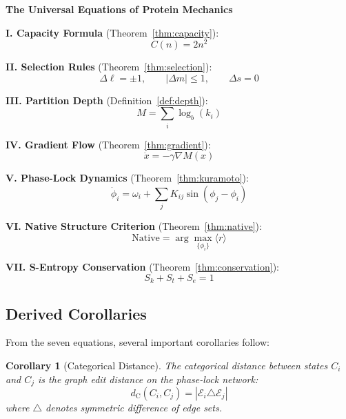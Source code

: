 \documentclass[aps,prx,superscriptaddress,twocolumn,10pt,a4paper,longbibliography,preprint]{revtex4-2}
\newcommand{\dC}{d_{\mathrm{C}}}
\newcommand{\calE}{\mathcal{E}}
\newcommand{\orderp}{\langle r \rangle}
\newtheorem{corollary}[theorem]{Corollary}
\theoremstyle{definition}
\theoremstyle{remark}
\begin{document}
\begin{mdframed}[linewidth=1.5pt, linecolor=black, backgroundcolor=gray!3]
\textbf{The Universal Equations of Protein Mechanics}

\medskip

\textbf{I. Capacity Formula} (Theorem~\ref{thm:capacity}):
\begin{equation}
C(n) = 2n^2
\tag{I}
\end{equation}

\textbf{II. Selection Rules} (Theorem~\ref{thm:selection}):
\begin{equation}
\Delta\ell = \pm 1, \qquad |\Delta m| \leq 1, \qquad \Delta s = 0
\tag{II}
\end{equation}

\textbf{III. Partition Depth} (Definition~\ref{def:depth}):
\begin{equation}
M = \sum_i \log_b(k_i)
\tag{III}
\end{equation}

\textbf{IV. Gradient Flow} (Theorem~\ref{thm:gradient}):
\begin{equation}
\dot{x} = -\gamma \nabla M(x)
\tag{IV}
\end{equation}

\textbf{V. Phase-Lock Dynamics} (Theorem~\ref{thm:kuramoto}):
\begin{equation}
\dot{\phi}_i = \omega_i + \sum_j K_{ij} \sin(\phi_j - \phi_i)
\tag{V}
\end{equation}

\textbf{VI. Native Structure Criterion} (Theorem~\ref{thm:native}):
\begin{equation}
\text{Native} = \arg\max_{\{\phi_i\}} \orderp
\tag{VI}
\end{equation}

\textbf{VII. S-Entropy Conservation} (Theorem~\ref{thm:conservation}):
\begin{equation}
S_k + S_t + S_e = 1
\tag{VII}
\end{equation}
\end{mdframed}

\subsection{Derived Corollaries}

From the seven equations, several important corollaries follow:

\begin{corollary}[Categorical Distance]
\label{cor:distance}
The categorical distance between states $C_i$ and $C_j$ is the graph edit distance on the phase-lock network:
\begin{equation}
\dC(C_i, C_j) = |\calE_i \triangle \calE_j|
\label{eq:categorical_distance}
\end{equation}
where $\triangle$ denotes symmetric difference of edge sets.
\end{corollary}
\end{document}
